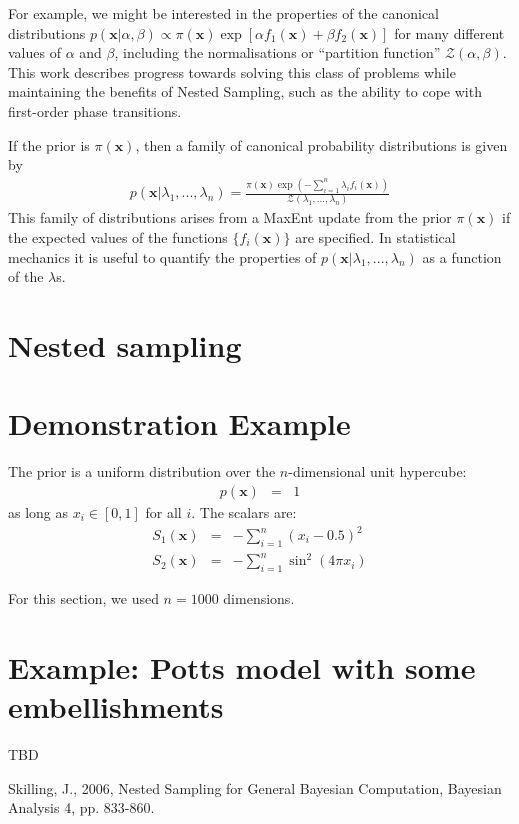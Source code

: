 \documentclass[a4paper, 11pt]{article}
\begin{document}
 For example, we might be interested in the
properties of the canonical distributions
$p(\mathbf{x} | \alpha, \beta) \propto \pi(\mathbf{x})\exp\left[\alpha f_1(\mathbf{x}) + \beta f_2(\mathbf{x})\right]$
for many different values of $\alpha$ and $\beta$, including the
normalisations or ``partition function'' $\mathcal{Z}(\alpha, \beta)$.
This work describes
progress towards solving this class of problems while maintaining the benefits
of Nested Sampling, such as the ability to cope with first-order phase
transitions.

If the prior is $\pi(\mathbf{x})$, then a family of canonical
probability distributions is given by
\begin{eqnarray}
p(\mathbf{x} | \lambda_1, ..., \lambda_n) = 
\frac{\pi(\mathbf{x})\exp(-\sum_{i=1}^n \lambda_i f_i(\mathbf{x}))}
{\mathcal{Z}(\lambda_1, ..., \lambda_n)}
\end{eqnarray}
This family of distributions arises from a MaxEnt update from the prior
$\pi(\mathbf{x})$ if the expected values of the functions
$\{f_i(\mathbf{x})\}$ are specified. In statistical mechanics it is useful to
quantify the properties of
$p(\mathbf{x} | \lambda_1, ..., \lambda_n)$ as a function of the
$\lambda$s.

\section{Nested sampling}


\section{Demonstration Example}
The prior is a uniform distribution over the $n$-dimensional unit hypercube:
\begin{eqnarray}
p(\mathbf{x}) &=& 1
\end{eqnarray}
as long as $x_i \in [0, 1]$ for all $i$. The scalars are:
\begin{eqnarray}
S_1(\mathbf{x}) &=& -\sum_{i=1}^n \left(x_i - 0.5\right)^2\\
S_2(\mathbf{x}) &=& -\sum_{i=1}^n \sin^2\left(4\pi x_i\right)
\end{eqnarray}

For this section, we used $n=1000$ dimensions.

\section{Example: Potts model with some embellishments}
TBD

\begin{thebibliography}{99}

 Skilling, J., 2006, Nested Sampling for General Bayesian Computation, Bayesian Analysis 4, pp. 833-860.

\end{thebibliography}
\end{document}
